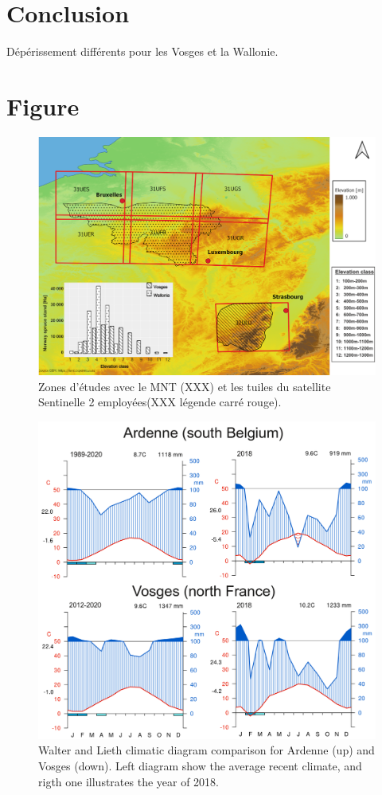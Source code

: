 \documentclass[3p,times]{elsarticle}
\begin{document}
\section{Conclusion}

Dépérissement différents pour les Vosges et la Wallonie.

\section{Figure}

\begin{figure} [htbp] 
	\centering
	\includegraphics[width=1\textwidth]{waql.png}
	\caption{Zones d'études avec le MNT (XXX) et les tuiles du satellite Sentinelle 2 employées(XXX légende carré rouge).}
	\label{fig:situ}
\end{figure}


\begin{figure} [htbp] 
	\centering
	\includegraphics[width=1\textwidth]{diagrammeOT-page001.png}
	\caption{Walter and Lieth climatic diagram comparison for Ardenne (up) and Vosges (down). Left diagram show the average recent climate, and rigth one illustrates the year of 2018.}
	\label{fig:diagOT}
\end{figure}
\end{document}
